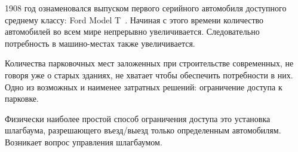 \label{sec:intro}

1908 год ознаменовался выпуском первого серийного автомобиля доступного среднему классу: Ford Model T~\cite{ford_t}. Начиная с этого времени количество автомобилей во всем мире непрерывно увеличивается. Следовательно потребность в машино-местах также увеличивается.

Количества парковочных мест заложенных при строительстве современных, не говоря уже о старых зданиях, не хватает чтобы обеспечить потребности в них. Одно из возможных и наименее затратных решений: ограничение доступа к парковке. 

Физически наиболее простой способ ограничения доступа это установка шлагбаума, разрешающего въезд/выезд только определенным автомобилям. Возникает вопрос управления шлагбаумом.